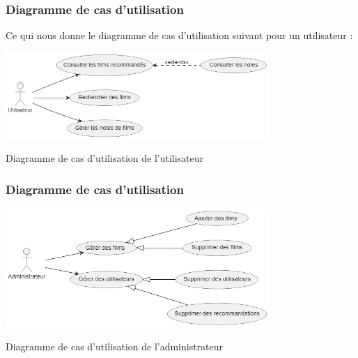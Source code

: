 \documentclass{beamer}
\begin{document}
\begin{frame}
    \frametitle{Diagramme de cas d'utilisation}
    \vspace{0.5cm}
    Ce qui nous donne le diagramme de cas d'utilisation suivant pour un utilisateur :
    \begin{center}
        \includegraphics[width=0.75\textwidth]{uc_utilisateur.png}

        {\small Diagramme de cas d'utilisation de l'utilisateur}
    \end{center}
\end{frame}

\begin{frame}
    \frametitle{Diagramme de cas d'utilisation}
    \begin{center}
        \includegraphics[width=0.75\textwidth]{admin.png}

        {\small Diagramme de cas d'utilisation de l'administrateur}
    \end{center}
\end{frame}


\end{document}
